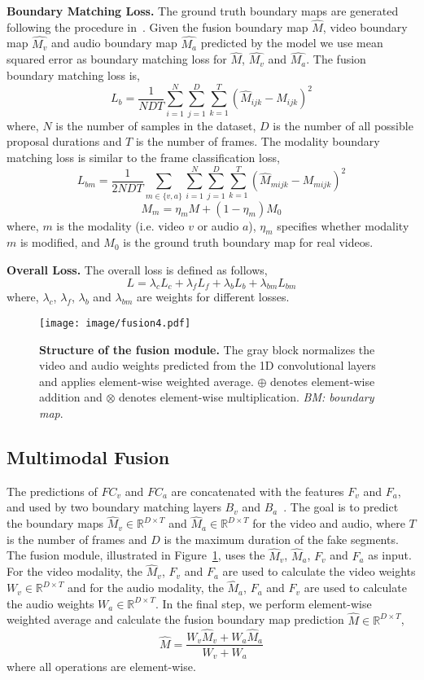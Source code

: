 \documentclass[conference, a4paper]{IEEEtran}
\makeatletter
\newcommand*{\ie}{i.e.\@\xspace}
\makeatother
\begin{document}
\noindent \textbf{Boundary Matching Loss.} The ground truth boundary maps are generated following the procedure in~\cite{lin_bmn_2019}. Given the fusion boundary map $\hat{M}$, video boundary map $\hat{M_v}$ and audio boundary map $\hat{M_a}$ predicted by the model we use mean squared error as boundary matching loss for $\hat{M}$, $\hat{M_v}$ and ${\hat{M_a}}$. The fusion boundary matching loss is,
$$L_b = \frac{1}{NDT}\sum^N_{i=1}\sum^D_{j=1}\sum^T_{k=1}(\hat{M}_{ijk}-M_{ijk})^2$$
where, $N$ is the number of samples in the dataset, $D$ is the number of all possible proposal durations and $T$ is the number of frames. The modality boundary matching loss is similar to the frame classification loss,
$$L_{bm} = \frac{1}{2NDT}\sum_{m\in\{v,a\}}\sum^N_{i=1}\sum^D_{j=1}\sum^T_{k=1}(\hat{M}_{mijk} - M_{mijk})^2 $$
$$M_m = \eta_m M + (1 - \eta_m)M_0$$
where, $m$ is the modality (\ie video $v$ or audio $a$), $\eta_m$ specifies whether modality $m$ is modified, and $M_0$ is the ground truth boundary map for real videos.

\noindent \textbf{Overall Loss.} The overall loss is defined as follows,
$$L = \lambda_c L_c + \lambda_f L_f + \lambda_b L_b + \lambda_{bm} L_{bm}$$
where, $\lambda_c$, $\lambda_f$, $\lambda_b$ and $\lambda_{bm}$ are weights for different losses.

\begin{figure}[t]
\centering
\texttt{[image: image/fusion4.pdf]}
\caption{\textbf{Structure of the fusion module.} The gray block normalizes the video and audio weights predicted from the 1D convolutional layers and applies element-wise weighted average. $\oplus$ denotes element-wise addition and $\otimes$ denotes element-wise multiplication. \textit{BM: boundary map}.}
\label{fig:fusion}
\end{figure}

\subsection{Multimodal Fusion}
The predictions of $FC_v$ and $FC_a$ are concatenated with the features $F_v$ and $F_a$, and used by two boundary matching layers $B_v$ and $B_a$~\cite{lin_bmn_2019}. The goal is to predict the boundary maps $\hat{M}_v \in \mathbb{R}^{D\times T}$ and $\hat{M}_a \in \mathbb{R}^{D\times T}$ for the video and audio, where $T$ is the number of frames and $D$ is the maximum duration of the fake segments. The fusion module, illustrated in Figure~\ref{fig:fusion}, uses the $\hat{M}_v$, $\hat{M}_a$, $F_v$ and $F_a$ as input. For the video modality, the $\hat{M}_v$, $F_v$ and $F_a$ are used to calculate the video weights $W_v \in \mathbb{R}^{D\times T}$ and for the audio modality, the $\hat{M}_a$, $F_a$ and $F_v$ are used to calculate the audio weights $W_a \in \mathbb{R}^{D\times T}$. In the final step, we perform element-wise weighted average and calculate the fusion boundary map prediction $\hat{M} \in \mathbb{R}^{D\times T}$,
$$\hat{M} = \frac{W_v \hat{M}_v + W_a \hat{M}_a}{W_v + W_a}$$
where all operations are element-wise.
\end{document}
